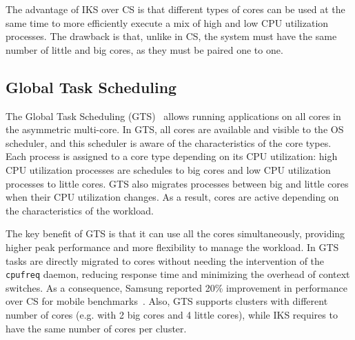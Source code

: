 The advantage of IKS over CS is that different types of cores can be used at the same time to more efficiently execute a mix of high and low CPU utilization processes. The drawback is that, unlike in CS, the system must have the same number of little and big cores, as they must be paired one to one.


\subsection{Global Task Scheduling}
The Global Task Scheduling (GTS)~\cite{samsung}
allows running applications on all cores in the asymmetric multi-core. In GTS, all cores are 
available and visible to the OS scheduler, and this scheduler is aware of the characteristics of 
the core types. Each process is assigned to a core type depending on its CPU utilization:
high CPU utilization processes are schedules to big cores and low CPU utilization processes to 
little cores. GTS also migrates processes between big and little cores when their CPU utilization 
changes. As a result, cores are active depending on the characteristics of the workload. 

The key benefit of GTS is that it can use all the cores simultaneously, providing higher peak 
performance and more flexibility to manage the workload. In GTS tasks are directly migrated to cores 
without needing the intervention of the \texttt{cpufreq} daemon, reducing response time and 
minimizing the overhead of context switches. As a consequence, Samsung reported 20\% improvement in 
performance over CS for mobile benchmarks~\cite{samsung}. Also, GTS supports clusters with 
different number of cores (e.g. with 2 big cores and 4 little cores), while IKS requires to have 
the same number of cores per cluster.

